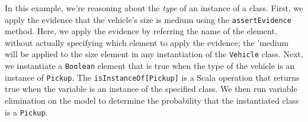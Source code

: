 In this example, we're reasoning about the \emph{type} of an instance of a class. First, we apply the evidence that the vehicle's size is medium using the \texttt{assertEvidence} method. Here, we apply the evidence by referring the name of the element, without actually specifying which element to apply the evidence; the 'medium will be applied to the size element in any instantiation of the \texttt{Vehicle} class. Next, we instantiate a \texttt{Boolean} element that is true when the type of the vehicle is an instance of \texttt{Pickup}. The \texttt{isInstanceOf[Pickup]} is a Scala operation that returns true when the variable is an instance of the specified class. We then run variable elimination on the model to determine the probability that the instantiated class is a \texttt{Pickup}.
